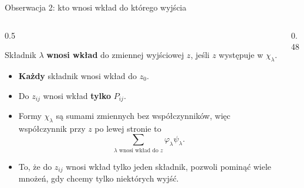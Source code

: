 \begin{frame}{Obserwacja 2: kto wnosi wkład do którego wyjścia}
  \begin{columns}[T]
    \begin{column}{0.5\textwidth}
      \small
      \begin{definicja}
        Składnik $\lambda$ \textbf{wnosi wkład} do zmiennej wyjściowej $z$, jeśli $z$ występuje w $\chi_\lambda$.
      \end{definicja}
      \begin{itemize}
        \item<2-> \textbf{Każdy} składnik wnosi wkład do $z_0$.
        \item<2-> Do $z_{ij}$ wnosi wkład \textbf{tylko} $P_{ij}$.
        \item<3-> Formy $\chi_\lambda$ są sumami zmiennych bez współczynników, więc współczynnik przy $z$ po lewej stronie to
          \[\sum_{\lambda\text{ wnosi wkład do }z}\varphi_\lambda\psi_\lambda.\]
        \item<4-> To, że do $z_{ij}$ wnosi wkład tylko jeden składnik, pozwoli
          \alert{pominąć wiele mnożeń}, gdy chcemy tylko niektórych wyjść.
      \end{itemize}
    \end{column}
    \begin{column}{0.48\textwidth}
      \centering
    \end{column}
  \end{columns}
\end{frame}
